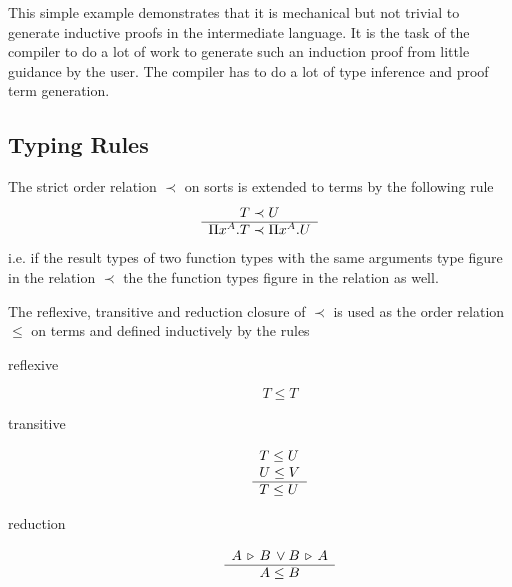 This simple example demonstrates that it is mechanical but not trivial to
generate inductive proofs in the intermediate language. It is the task of the
compiler to do a lot of work to generate such an induction proof from little
guidance by the user. The compiler has to do a lot of type inference and proof
term generation.








\subsection{Typing Rules}
\label{sec:typing-rules}

\begin{definition}
  The strict order relation $\prec$ on sorts is extended to terms by the following
  rule
  $$
  \begin{array}{c} T \prec U \\ \hline \Pi x^A.T \prec \Pi x^A. U\end{array}
  $$
  i.e. if the result types of two function types with the same arguments type
  figure in the relation $\prec$ the the function types figure in the relation
  as well.
\end{definition}

\begin{definition}
  The reflexive, transitive and reduction closure of $\prec$ is used as the
  order relation $\le$ on terms and defined inductively by the rules
  \begin{description}
  \item[reflexive]
    $$
    T \le T
    $$

  \item[transitive]
    $$
    \begin{array}{l} T \le U \\ U \le V \\ \hline T \le U\end{array}
    $$

  \item[reduction]
    $$
    \begin{array}{c} A \,\triangleright\, B \, \lor B \,\triangleright\, A \\ \hline A \le B\end{array}
    $$
  \end{description}
\end{definition}


